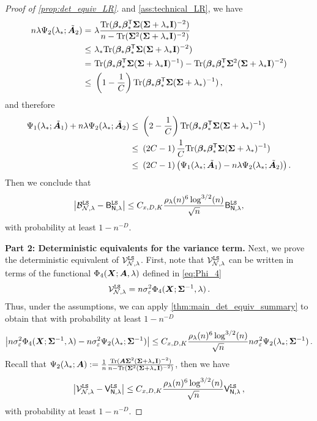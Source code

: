 \begin{proof}[Proof of \cref{prop:det_equiv_LR}]
and \cref{ass:technical_LR}, we have
\[
\begin{aligned}
    n\lambda\Psi_2(\lambda_*; \tilde{{\boldsymbol A}}_2) =&~ \lambda\frac{{\rm Tr}({\boldsymbol \beta}_*{\boldsymbol \beta}_*^{\mathsf T}{\boldsymbol \Sigma} ({\boldsymbol \Sigma} + \lambda_*{\mathbf I})^{-2})}{n - {\rm Tr}({\boldsymbol \Sigma}^2 ({\boldsymbol \Sigma} + \lambda_*{\mathbf I})^{-2})}\\
    \leq&~ \lambda_*{\rm Tr}({\boldsymbol \beta}_*{\boldsymbol \beta}_*^{\mathsf T}{\boldsymbol \Sigma} ({\boldsymbol \Sigma} + \lambda_*{\mathbf I})^{-2})\\
    =&~ {\rm Tr}({\boldsymbol \beta}_*{\boldsymbol \beta}_*^{\mathsf T} {\boldsymbol \Sigma} ({\boldsymbol \Sigma} + \lambda_*{\mathbf I})^{-1}) - {\rm Tr}({\boldsymbol \beta}_*{\boldsymbol \beta}_*^{\mathsf T}{\boldsymbol \Sigma}^2 ({\boldsymbol \Sigma} + \lambda_*{\mathbf I})^{-2})\\
    \leq&~ \left(1-\frac{1}{C}\right) {\rm Tr}({\boldsymbol \beta}_*{\boldsymbol \beta}_*^{\mathsf T}{\boldsymbol \Sigma}({\boldsymbol \Sigma}+\lambda_*)^{-1})\,,
\end{aligned}
\]
and therefore
\[
\begin{aligned}
    \Psi_1(\lambda_*; \tilde{{\boldsymbol A}}_1)+n\lambda\Psi_2(\lambda_*; \tilde{{\boldsymbol A}}_2) \leq&~ \left(2-\frac{1}{C}\right) {\rm Tr}({\boldsymbol \beta}_*{\boldsymbol \beta}_*^{\mathsf T}{\boldsymbol \Sigma}({\boldsymbol \Sigma}+\lambda_*)^{-1})\\
    \leq&~ \left(2C-1\right)\frac{1}{C}{\rm Tr}({\boldsymbol \beta}_*{\boldsymbol \beta}_*^{\mathsf T}{\boldsymbol \Sigma}({\boldsymbol \Sigma}+\lambda_*)^{-1})\\
    \leq&~ \left(2C-1\right)\left(\Psi_1(\lambda_*; \tilde{{\boldsymbol A}}_1)-n\lambda\Psi_2(\lambda_*; \tilde{{\boldsymbol A}}_2)\right).
\end{aligned}
\]
Then we conclude that
\[
    \left|\mathcal{B}_{\mathcal{N},\lambda}^{\tt LS} - \mathsf B_{\mathsf N,\lambda}^{\tt LS}\right| \leq C_{x, D, K} \frac{\rho_{\lambda}(n)^6 \log^{3/2}(n)}{\sqrt{n}}\mathsf B_{\mathsf N,\lambda}^{\tt LS},
\]
with probability at least $1-n^{-D}$.

{\bf Part 2: Deterministic equivalents for the variance term.} Next, we prove the deterministic equivalent of $\mathcal{V}_{\mathcal{N},\lambda}^{\tt LS}$. First, note that $\mathcal{V}_{\mathcal{N},\lambda}^{\tt LS}$ can be written in terms of the functional $\Phi_4({\boldsymbol X}; {\boldsymbol A}, \lambda)$ defined in \cref{eq:Phi_4}
\[
    \mathcal{V}_{\mathcal{N},\lambda}^{\tt LS} = n\sigma_{\varepsilon}^2\Phi_4({\boldsymbol X}; {\boldsymbol \Sigma}^{-1}, \lambda)\,.
\]
Thus, under the assumptions, we can apply \cref{thm:main_det_equiv_summary} to obtain that with probability at least $1-n^{-D}$
\[
\left|n\sigma_{\varepsilon}^2\Phi_4({\boldsymbol X}; {\boldsymbol \Sigma}^{-1}, \lambda) - n\sigma_{\varepsilon}^2\Psi_2(\lambda_*; {\boldsymbol \Sigma}^{-1})\right| \leq C_{x, D, K} \frac{\rho_{\lambda}(n)^6 \log^{3/2}(n)}{\sqrt{n}} n\sigma_{\varepsilon}^2\Psi_2(\lambda_*; {\boldsymbol \Sigma}^{-1})\,.
\]
Recall that $\Psi_2(\lambda_*; {\boldsymbol A}) := \frac{1}{n} \frac{{\rm Tr}({\boldsymbol A} {\boldsymbol \Sigma}^2 ({\boldsymbol \Sigma} + \lambda_*{\mathbf I})^{-2})}{n - {\rm Tr}({\boldsymbol \Sigma}^2 ({\boldsymbol \Sigma} + \lambda_*{\mathbf I})^{-2})}$, then we have
\[
\left|\mathcal{V}_{\mathcal{N},\lambda}^{\tt LS} - \mathsf V_{\mathsf N,\lambda}^{\tt LS}\right| \leq C_{x, D, K} \frac{\rho_{\lambda}(n)^6 \log^{3/2}(n)}{\sqrt{n}} \mathsf V_{\mathsf N,\lambda}^{\tt LS}\,,
\]
with probability at least $1-n^{-D}$.
\end{proof}